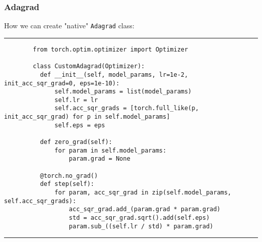     \begin{frame}[fragile]
      \frametitle{Adagrad}
      \vspace{0.2cm}
      How we can create "native" \verb|Adagrad| class:
      \rule{\textwidth}{1pt}
      \scriptsize
      \begin{verbatim}
        from torch.optim.optimizer import Optimizer

        class CustomAdagrad(Optimizer):
          def __init__(self, model_params, lr=1e-2, init_acc_sqr_grad=0, eps=1e-10):
              self.model_params = list(model_params)
              self.lr = lr
              self.acc_sqr_grads = [torch.full_like(p, init_acc_sqr_grad) for p in self.model_params]
              self.eps = eps

          def zero_grad(self):
              for param in self.model_params:
                  param.grad = None

          @torch.no_grad()
          def step(self):
              for param, acc_sqr_grad in zip(self.model_params, self.acc_sqr_grads):
                  acc_sqr_grad.add_(param.grad * param.grad)
                  std = acc_sqr_grad.sqrt().add(self.eps)
                  param.sub_((self.lr / std) * param.grad)
      \end{verbatim}
      \rule{\textwidth}{1pt}
    \end{frame}

    
